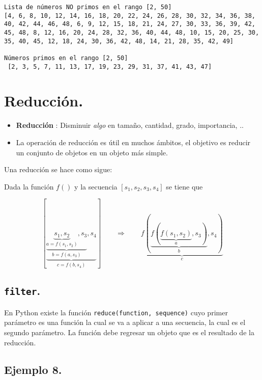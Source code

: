 \documentclass[
  letterpaper,
  DIV=11,
  numbers=noendperiod]{scrreprt}
\begin{document}
\begin{verbatim}
Lista de números NO primos en el rango [2, 50] 
[4, 6, 8, 10, 12, 14, 16, 18, 20, 22, 24, 26, 28, 30, 32, 34, 36, 38, 40, 42, 44, 46, 48, 6, 9, 12, 15, 18, 21, 24, 27, 30, 33, 36, 39, 42, 45, 48, 8, 12, 16, 20, 24, 28, 32, 36, 40, 44, 48, 10, 15, 20, 25, 30, 35, 40, 45, 12, 18, 24, 30, 36, 42, 48, 14, 21, 28, 35, 42, 49]

Números primos en el rango [2, 50] 
 [2, 3, 5, 7, 11, 13, 17, 19, 23, 29, 31, 37, 41, 43, 47]
\end{verbatim}


\chapter{Reducción.}\label{reducciuxf3n.}

\begin{itemize}
\item
  \textbf{Reducción} : Disminuir \emph{algo} en tamaño, cantidad, grado,
  importancia, ..
\item
  La operación de reducción es útil en muchos ámbitos, el objetivo es
  reducir un conjunto de objetos en un objeto más simple.
\end{itemize}

Una reducción se hace como sigue:

Dada la función \(f()\) y la secuencia \([s_1, s_2, s_3, s_4]\) se tiene
que

\[
[\underbrace{\underbrace{\underbrace{s_1, s_2}_{a = f(s_1,s_2)}, s_3}_{b = f(a,s_3)}, s_4}_{c = f(b,s_4)}] \qquad \Longrightarrow \qquad \underbrace{f(\underbrace{f(\underbrace{f(s_1,s_2)}_{a}, s_3)}_{b}, s_4)}_{c}
\]

\section{\texorpdfstring{\texttt{filter}.}{filter.}}\label{filter.-1}

En Python existe la función \texttt{reduce(function,\ sequence)} cuyo
primer parámetro es una función la cual se va a aplicar a una secuencia,
la cual es el segundo parámetro. La función debe regresar un objeto que
es el resultado de la reducción.

\section{\texorpdfstring{\textbf{Ejemplo
8.}}{Ejemplo 8.}}\label{ejemplo-8.}
\end{document}
